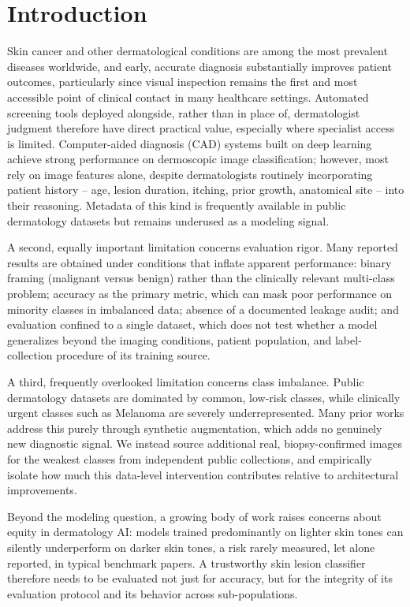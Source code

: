 \documentclass[conference]{IEEEtran}
\begin{document}
\section{Introduction}
Skin cancer and other dermatological conditions are among the most prevalent diseases worldwide, and early, accurate diagnosis substantially improves patient outcomes, particularly since visual inspection remains the first and most accessible point of clinical contact in many healthcare settings. Automated screening tools deployed alongside, rather than in place of, dermatologist judgment therefore have direct practical value, especially where specialist access is limited. Computer-aided diagnosis (CAD) systems built on deep learning achieve strong performance on dermoscopic image classification; however, most rely on image features alone, despite dermatologists routinely incorporating patient history -- age, lesion duration, itching, prior growth, anatomical site -- into their reasoning. Metadata of this kind is frequently available in public dermatology datasets but remains underused as a modeling signal.

A second, equally important limitation concerns evaluation rigor. Many reported results are obtained under conditions that inflate apparent performance: binary framing (malignant versus benign) rather than the clinically relevant multi-class problem; accuracy as the primary metric, which can mask poor performance on minority classes in imbalanced data; absence of a documented leakage audit; and evaluation confined to a single dataset, which does not test whether a model generalizes beyond the imaging conditions, patient population, and label-collection procedure of its training source.

A third, frequently overlooked limitation concerns class imbalance. Public dermatology datasets are dominated by common, low-risk classes, while clinically urgent classes such as Melanoma are severely underrepresented. Many prior works address this purely through synthetic augmentation, which adds no genuinely new diagnostic signal. We instead source additional real, biopsy-confirmed images for the weakest classes from independent public collections, and empirically isolate how much this data-level intervention contributes relative to architectural improvements.

Beyond the modeling question, a growing body of work raises concerns about equity in dermatology AI: models trained predominantly on lighter skin tones can silently underperform on darker skin tones, a risk rarely measured, let alone reported, in typical benchmark papers. A trustworthy skin lesion classifier therefore needs to be evaluated not just for accuracy, but for the integrity of its evaluation protocol and its behavior across sub-populations.
\end{document}
